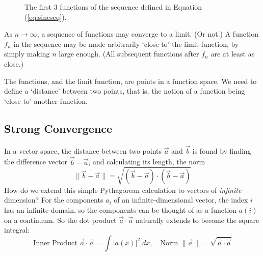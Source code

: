 \documentclass[12pt, a4paper, twoside, openright]{book}
\begin{document}
\begin{figure}[ht]
\centering
{}
\caption{The first 3 functions of the sequence defined in Equation (\ref{eq:sineseq}).}\label{sinesequence}
\end{figure}

As $n \rightarrow \infty$, a sequence of functions may converge to a limit. (Or not.)
A function $f_n$ in the sequence may be made arbitrarily `close to' the limit function, by simply making $n$ large enough. (All subsequent functions after $f_n$ are at least as close.)

The functions, and the limit function, are points in a function space.  We need to define a `distance' between two points, that is, the notion of a function being `close to' another function.

\subsection{Strong Convergence}

In a vector space, the distance between two points $\vec{a}$ and $\vec{b}$ is found by finding the difference vector $\vec{b} - \vec{a}$, and calculating its length, the norm 
\begin{equation}
\lVert  \vec{b} - \vec{a} \rVert = \sqrt{(\vec{b} - \vec{a})\cdot (\vec{b} - \vec{a})}
\end{equation}
How do we extend this simple Pythagorean calculation to vectors of \emph{infinite} dimension? For the components $a_i$ of an infinite-dimensional vector, the index $i$ has an infinite domain, so the components can be thought of as a function $a(i)$ on a continuum. So the dot product $\vec{a} \cdot \vec{a}$ naturally extends to become the square integral:
\begin{equation}
\text{Inner Product } \vec{a} \cdot \vec{a} = \int \lvert a(x) \rvert^2 \;dx,
\quad \text{Norm } \lVert \vec{a} \rVert = \sqrt{\vec{a} \cdot \vec{a} }
\end{equation}
\end{document}
